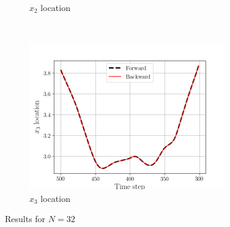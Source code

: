 \begin{figure}[H]
\begin{subfigure}[H]{0.45\textwidth}
        \caption{$x_{2}$ location}
    \end{subfigure}
    ~
    \begin{subfigure}[H]{0.45\textwidth}
        \includegraphics[height=2.5in]{media/rk4/run-32/x3-32-tracking-2.png}
        \caption{$x_{3}$ location}
    \end{subfigure}
    \caption{Results for $N=32$}
    \label{fig:back-tracking-32-2}
\end{figure}
\newpage

